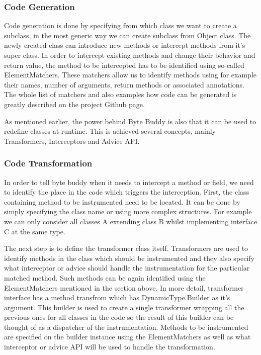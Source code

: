 \subsubsection{Code Generation}
Code generation is done by specifying from which class we want to create a subclass, in the most generic way we can create subclass from Object class. The newly created class can introduce new methods or intercept methods from it's super class. In order to intercept existing methods and change their behavior and return value, the method to be intercepted has to be identified using so-called ElementMatchers. These matchers allow us to identify methods using for example their names, number of arguments, return methods or associated annotations. The whole list of matchers and also examples how code can be generated is greatly described on the project Github page.

As mentioned earlier, the power behind Byte Buddy is also that it can be used to redefine classes at runtime. This is achieved several concepts, mainly Transformers, Interceptors and Advice API.
\subsubsection{Code Transformation}
In order to tell byte buddy when it needs to intercept a method or field, we need to identify the place in the code which triggers the interception. First,  the class containing method to be instrumented need to be located. It can be done by simply specifying the class name or using more complex structures. For example we can only consider all classes A extending class B whilst implementing interface C at the same type. 

The next step is to define the transformer class itself. Transformers are used to identify methods in the class which should be instrumented and they also specify what interceptor or advice should handle the instrumentation for the particular matched method. Such methods can be again identified using the ElementMatchers mentioned in the section above. In more detail, transformer interface has a method transfrom which has DynamicType.Builder as it's argument. This builder is used to create a single transformer wrapping all the previous ones for all classes in the code so the result of this builder can be thought of as a dispatcher of the instrumentation. Methods to be instrumented are specified on the builder instance using the ElementMatchers  as well as what interceptor or advice API will be used to handle the transformation.

